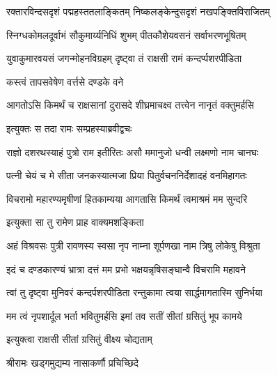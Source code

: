 \twolineshloka
{रक्तारविन्दसदृशं पद्महस्ततलाङ्कितम्}
{निष्कलङ्केन्दुसदृशं नखपङ्क्तिविराजितम्}%

\twolineshloka
{स्निग्धकोमलदूर्वाभं सौकुमार्य्यनिधिं शुभम्}
{पीतकौशेयवसनं सर्वाभरणभूषितम्}%

\twolineshloka
{युवाकुमारवयसं जगन्मोहनविग्रहम्}
{दृष्ट्वा तं राक्षसी रामं कन्दर्प्पशरपीडिता}%


\onelineshloka
{कस्त्वं तापसवेषेण वर्त्तसे दण्डके वने}%

\twolineshloka
{आगतोऽसि किमर्थं च राक्षसानां दुरासदे}
{शीघ्रमाचक्ष्व तत्त्वेन नानृतं वक्तुमर्हसि}%


इत्युक्तः स तदा रामः सम्प्रहस्याब्रवीद्वचः


\twolineshloka
{राज्ञो दशरथस्याहं पुत्रो राम इतीरितः}
{असौ ममानुजो धन्वी लक्ष्मणो नाम चानघः}%

\twolineshloka
{पत्नी चेयं च मे सीता जनकस्यात्मजा प्रिया}
{पितुर्वचननिर्देशादहं वनमिहागतः}%

\twolineshloka
{विचरामो महारण्यमृषीणां हितकाम्यया}
{आगतासि किमर्थं त्वमाश्रमं मम सुन्दरि}%


\onelineshloka
{इत्युक्ता सा तु रामेण प्राह वाक्यमशङ्किता}%


\twolineshloka
{अहं विश्रवसः पुत्री रावणस्य स्वसा नृप}
{नाम्ना शूर्पणखा नाम त्रिषु लोकेषु विश्रुता}%

\twolineshloka
{इदं च दण्डकारण्यं भ्रात्रा दत्तं मम प्रभो}
{भक्षयन्नृषिसङ्घान्वै विचरामि महावने}%

\twolineshloka
{त्वां तु दृष्ट्वा मुनिवरं कन्दर्पशरपीडिता}
{रन्तुकामा त्वया सार्द्धमागतास्मि सुनिर्भया}%

\twolineshloka
{मम त्वं नृपशार्दूल भर्ता भवितुमर्हसि}
{इमां तव सतीं सीतां ग्रसितुं भूप कामये}%



\onelineshloka
{इत्युक्त्वा राक्षसी सीतां ग्रसितुं वीक्ष्य चोद्यताम्}%

\onelineshloka
{श्रीरामः खड्गमुद्यम्य नासाकर्णौ प्रचिच्छिदे}%

